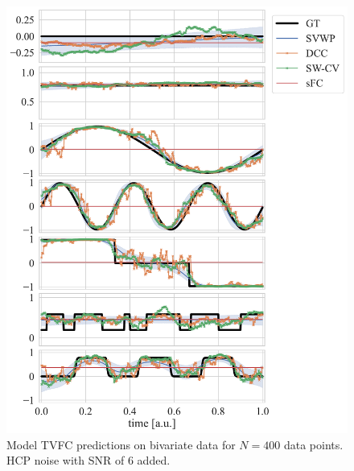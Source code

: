 \begin{figure}[h]
  \centering
  \includegraphics[width=\textwidth]{fig/sim/d2/N0400_T0200/HCP_noise_snr_6/all_covs_types_correlations}
  \caption{
    Model TVFC predictions on bivariate data for $N=400$ data points.
    HCP noise with SNR of 6 added.
  }\label{fig:results-all-covariance-structures-tvfc-predictions-snr-6}
\end{figure}


